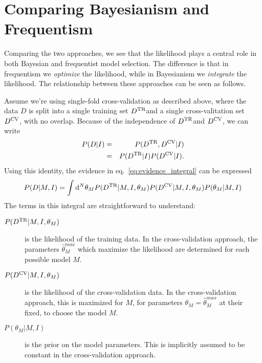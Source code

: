 \documentclass[12pt]{article}
\newcommand{\dd}{\mathrm{d}}
\newcommand{\Dtr}{\ensuremath{D^{\rm TR}}}
\newcommand{\Dcv}{\ensuremath{D^{\rm CV}}}
\newcommand{\eqn}[1]{eq.~\ref{eq:#1}}
\begin{document}
\section{Comparing Bayesianism and Frequentism}
Comparing the two approaches, we see that the likelihood plays a central
role in both Bayesian and frequentist model selection.  The difference
is that in frequentism we {\it optimize} the likelihood, while in
Bayesianism we {\it integrate} the likelihood.  The relationship between
these approaches can be seen as follows.

Assume we're using single-fold cross-validation as described above, where
the data $D$ is split into a single training set \Dtr and a single
cross-valitation set \Dcv, with no overlap.
Because of the independence of \Dtr and \Dcv, we can write
\begin{eqnarray}
  P(D|I) &=& P(\Dtr,\Dcv|I)\\
             &=& P(\Dtr|I)P(\Dcv|I).
\end{eqnarray}
Using this identity, the evidence in \eqn{evidence_integral} can be expressed
\begin{equation}
  P(D|M,I) = \int \dd^N\theta_M P(\Dtr|M, I, \theta_M)
  P(\Dcv|M,I,\theta_M)P(\theta_M|M,I)
\end{equation}
The terms in this integral are straightforward to understand:
\begin{description}
  \item[$P(\Dtr|M, I, \theta_M)$] is the likelihood of the training data.
    In the cross-validation approach, the parameters $\hat{\theta}^{max}_M$ which
    maximize the likelihood are determined for each possible model $M$.
  \item[$P(\Dcv|M, I, \theta_M)$] is the likelihood of the cross-validation
    data.  In the cross-validation approach, this is maximized for $M$,
    for parameters $\theta_M = \hat{\theta}^{max}_M$ at their fixed, to choose
    the model $M$.
  \item[$P(\theta_M|M,I)$] is the prior on the model parameters.  This is
    implicitly assumed to be constant in the cross-validation approach.
\end{description}
\end{document}
